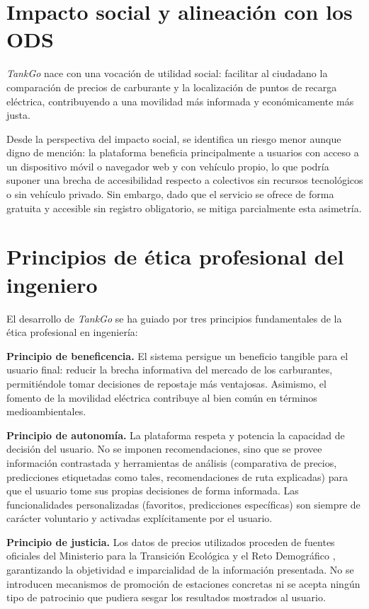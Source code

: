 \section{Impacto social y alineación con los ODS}
\label{sec:etica-ods}

\textit{TankGo} nace con una vocación de utilidad social: facilitar al ciudadano
la comparación de precios de carburante y la localización de puntos de recarga eléctrica,
contribuyendo a una movilidad más informada y económicamente más justa.

Desde la perspectiva del impacto social, se identifica un riesgo menor aunque digno de
mención: la plataforma beneficia principalmente a usuarios con acceso a un dispositivo
móvil o navegador web y con vehículo propio, lo que podría suponer una brecha de
accesibilidad respecto a colectivos sin recursos tecnológicos o sin vehículo privado.
Sin embargo, dado que el servicio se ofrece de forma gratuita y accesible sin registro
obligatorio, se mitiga parcialmente esta asimetría.

\section{Principios de ética profesional del ingeniero}
\label{sec:etica-profesional}

El desarrollo de \textit{TankGo} se ha guiado por tres principios fundamentales de la
ética profesional en ingeniería:

\textbf{Principio de beneficencia.} El sistema persigue un beneficio tangible para el
usuario final: reducir la brecha informativa del mercado de los carburantes,
permitiéndole tomar decisiones de repostaje más ventajosas. Asimismo, el fomento de
la movilidad eléctrica contribuye al bien común en términos medioambientales.

\textbf{Principio de autonomía.} La plataforma respeta y potencia la capacidad de
decisión del usuario. No se imponen recomendaciones, sino que se provee información
contrastada y herramientas de análisis (comparativa de precios, predicciones
etiquetadas como tales, recomendaciones de ruta explicadas) para que el usuario
tome sus propias decisiones de forma informada. Las funcionalidades personalizadas
(favoritos, predicciones específicas) son siempre de carácter voluntario y activadas
explícitamente por el usuario.

\textbf{Principio de justicia.} Los datos de precios utilizados proceden de fuentes
oficiales del Ministerio para la Transición Ecológica y el Reto Demográfico
\cite{datosgob_carburantes}, garantizando la objetividad e imparcialidad de la
información presentada. No se introducen mecanismos de promoción de estaciones
concretas ni se acepta ningún tipo de patrocinio que pudiera sesgar los resultados
mostrados al usuario.

